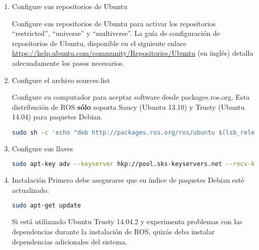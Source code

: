 \begin{enumerate}
\renewcommand{\labelenumii}{\theenumii}
\renewcommand{\theenumii}{\theenumi.\arabic{enumii}.}
	\item Configure sus repositorios de Ubuntu

	Configure sus repositorios de Ubuntu para activar los repositorios ``restricted'', ``universe'' y ``multiverse''. La guía de configuración de repositorios de Ubuntu, disponible en el siguiente enlace \url{https://help.ubuntu.com/community/Repositories/Ubuntu} (en inglés) detalla adecuadamente los pasos necesarios.
	\item Configure el archivo sources.list

	Configure su computador para aceptar software desde packages.ros.org. Esta distribución de ROS \textbf{sólo} soporta Saucy (Ubuntu 13.10) y Trusty (Ubuntu 14.04) para paquetes Debian.

	\begin{blackcodebox}
	\begin{lstlisting}[language=bash]
sudo sh -c 'echo "deb http://packages.ros.org/ros/ubuntu $(lsb_release -sc) main" > /etc/apt/sources.list.d/ros-latest.list'
	\end{lstlisting}
	\end{blackcodebox}

	\item Configure sus llaves

	\begin{blackcodebox}
	\begin{lstlisting}[language=bash]
sudo apt-key adv --keyserver hkp://pool.sks-keyservers.net --recv-key\\ 0xB01FA116
	\end{lstlisting}
	\end{blackcodebox}

	\item Instalación
	Primero debe asegurarse que su índice de paquetes Debian esté actualizado:

	\begin{blackcodebox}
	\begin{lstlisting}[language=bash]
sudo apt-get update
	\end{lstlisting}
	\end{blackcodebox}

	Si está utilizando Ubuntu Trusty 14.04.2 y experimenta problemas con las dependencias durante la instalación de ROS, quizás deba instalar dependencias adicionales del sistema.


\end{enumerate}

